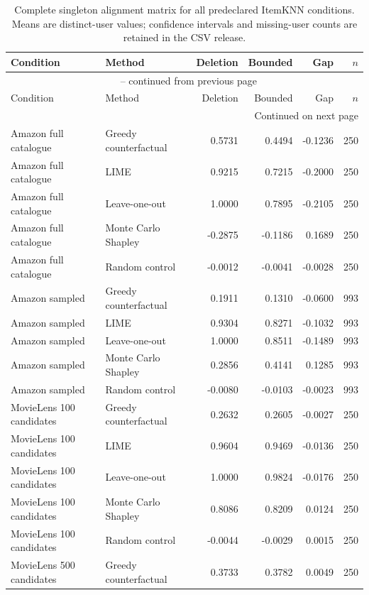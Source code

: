 \begin{longtable}{@{}p{}p{}rrrr@{}}
\caption{Complete singleton alignment matrix for all predeclared ItemKNN conditions. Means are distinct-user values; confidence intervals and missing-user counts are retained in the CSV release.}\label{tab:S1}\\
\toprule
Condition & Method & Deletion & Bounded & Gap & $n$ \\
\midrule
\endfirsthead
\multicolumn{6}{c}{\tablename\ \thetable{} -- continued from previous page}\\
\toprule
Condition & Method & Deletion & Bounded & Gap & $n$ \\
\midrule
\endhead
\midrule
\multicolumn{6}{r}{Continued on next page}\\
\endfoot
\bottomrule
\endlastfoot
Amazon full catalogue & Greedy counterfactual & 0.5731 & 0.4494 & -0.1236 & 250 \\
Amazon full catalogue & LIME & 0.9215 & 0.7215 & -0.2000 & 250 \\
Amazon full catalogue & Leave-one-out & 1.0000 & 0.7895 & -0.2105 & 250 \\
Amazon full catalogue & Monte Carlo Shapley & -0.2875 & -0.1186 & 0.1689 & 250 \\
Amazon full catalogue & Random control & -0.0012 & -0.0041 & -0.0028 & 250 \\
Amazon sampled & Greedy counterfactual & 0.1911 & 0.1310 & -0.0600 & 993 \\
Amazon sampled & LIME & 0.9304 & 0.8271 & -0.1032 & 993 \\
Amazon sampled & Leave-one-out & 1.0000 & 0.8511 & -0.1489 & 993 \\
Amazon sampled & Monte Carlo Shapley & 0.2856 & 0.4141 & 0.1285 & 993 \\
Amazon sampled & Random control & -0.0080 & -0.0103 & -0.0023 & 993 \\
MovieLens 100 candidates & Greedy counterfactual & 0.2632 & 0.2605 & -0.0027 & 250 \\
MovieLens 100 candidates & LIME & 0.9604 & 0.9469 & -0.0136 & 250 \\
MovieLens 100 candidates & Leave-one-out & 1.0000 & 0.9824 & -0.0176 & 250 \\
MovieLens 100 candidates & Monte Carlo Shapley & 0.8086 & 0.8209 & 0.0124 & 250 \\
MovieLens 100 candidates & Random control & -0.0044 & -0.0029 & 0.0015 & 250 \\
MovieLens 500 candidates & Greedy counterfactual & 0.3733 & 0.3782 & 0.0049 & 250 \\

\end{longtable}
